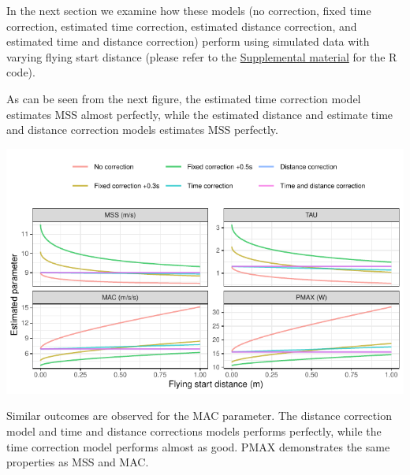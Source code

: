 \documentclass[fleqn,10pt]{wlpeerj} %
\newenvironment{Shaded}{\begin{snugshade}}{\end{snugshade}}
\newcommand{\AttributeTok}[1]{\textcolor[rgb]{0.77,0.63,0.00}{#1}}
\newcommand{\CommentTok}[1]{\textcolor[rgb]{0.56,0.35,0.01}{\textit{#1}}}
\newcommand{\FunctionTok}[1]{\textcolor[rgb]{0.00,0.00,0.00}{#1}}
\newcommand{\NormalTok}[1]{#1}
\newcommand{\SpecialCharTok}[1]{\textcolor[rgb]{0.00,0.00,0.00}{#1}}
\begin{document}
\begin{Shaded}
\end{Shaded}

\normalsize

In the next section we examine how these models (no correction, fixed time correction, estimated time correction, estimated distance correction, and estimated time and distance correction) perform using simulated data with varying flying start distance (please refer to the \protect\hyperlink{supplemental-material}{Supplemental material} for the R code).

\small

\normalsize

As can be seen from the next figure, the estimated time correction model estimates MSS almost perfectly, while the estimated distance and estimate time and distance correction models estimates MSS perfectly.

\small

\begin{center}\includegraphics[width=0.9\linewidth]{paper_files/figure-latex/unnamed-chunk-38-1} \end{center}

\normalsize

Similar outcomes are observed for the MAC parameter. The distance correction model and time and distance corrections models performs perfectly, while the time correction model performs almost as good. PMAX demonstrates the same properties as MSS and MAC.
\end{document}
